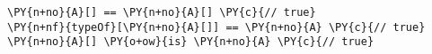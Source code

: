 \begin{Verbatim}[commandchars=\\\{\}]
\PY{n+no}{A}[] == \PY{n+no}{A}[] \PY{c}{// true}
\PY{n+nf}{typeOf}[\PY{n+no}{A}[]] == \PY{n+no}{A} \PY{c}{// true}
\PY{n+no}{A}[] \PY{o+ow}{is} \PY{n+no}{A} \PY{c}{// true}
\end{Verbatim}
